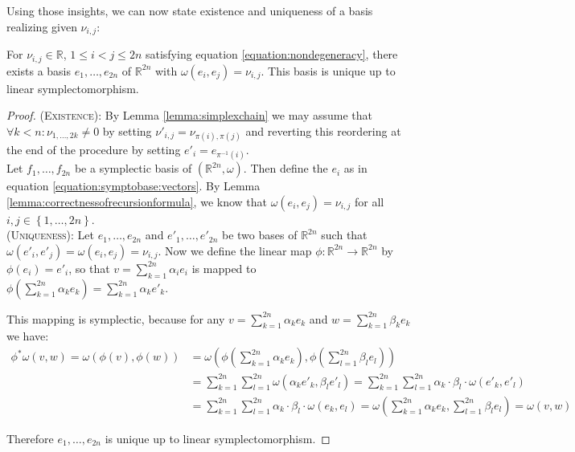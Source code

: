 \documentclass[../SymplecticSimplices.tex]{subfiles}
\begin{document}
Using those insights, we can now state existence and uniqueness of a basis realizing given \( \nu_{i,j} \):

\begin{theorem}
  \label{theorem:uniquebase}
  For \( \nu_{i,j} \in \mathbb{R} \), \( 1 \leq i < j \leq 2n \) satisfying equation \eqref{equation:nondegeneracy}, there exists a basis \( e_1, \dots, e_{2n} \) of \( \mathbb{R}^{2n} \) with \( \omega \left( e_i, e_j \right) = \nu_{i,j} \).
  This basis is unique up to linear symplectomorphism.
\end{theorem}

\begin{proof}
  (\textsc{Existence}): By Lemma \ref{lemma:simplexchain} we may assume that \( \forall k < n : \nu_{1,\dots,2k } \neq 0 \) by setting \( \nu'_{i,j} = \nu_{\pi\left( i \right), \pi \left( j \right)} \) and reverting this reordering at the end of the procedure by setting \( e'_i = e_{\pi^{-1} \left( i \right)} \).\\
  Let \( f_1, \dots, f_{2n} \) be a symplectic basis of \( \left( \mathbb{R}^{2n}, \omega \right) \). Then define the \( e_i \) as in equation \eqref{equation:symptobase:vectors}. By Lemma \ref{lemma:correctnessofrecursionformula}, we know that \( \omega \left( e_i, e_j \right) = \nu_{i,j} \) for all \( i,j \in \left\lbrace 1, \dots, 2n \right\rbrace \).\\

  (\textsc{Uniqueness}): Let \( e_1, \dots , e_{2n} \) and \( e'_1, \dots, e'_{2n} \) be two bases of \( \mathbb{R}^{2n} \) such that \( \omega \left( e'_i, e'_j \right) = \omega \left( e_i, e_j \right) = \nu_{i,j} \). Now we define the linear map \( \phi \colon \mathbb{R}^{2n} \rightarrow \mathbb{R}^{2n} \) by \( \phi \left( e_i \right) = e'_i \), so that \( v = \sum_{k=1}^{2n} \alpha_i e_i \) is mapped to \( \phi \left( \sum_{k=1}^{2n} \alpha_k e_k \right) = \sum_{k=1}^{2n} \alpha_k e'_k \).
  
  This mapping is symplectic, because for any \( v  = \sum_{k=1}^{2n} \alpha_k e_k \) and \( w = \sum_{k=1}^{2n} \beta_k e_k \) we have:
  \begin{align*}
    \phi^{\ast} \omega \left( v, w \right) = \omega \left( \phi \left( v \right), \phi \left( w \right) \right) & = \omega \left( \phi \left( \sum_{k=1}^{2n} \alpha_k e_k \right), \phi \left( \sum_{l=1}^{2n} \beta_l e_l \right) \right) \\ &
        = \sum_{k=1}^{2n} \sum_{l=1}^{2n} \omega \left( \alpha_k e'_k, \beta_l e'_l \right) 
        = \sum_{k=1}^{2n} \sum_{l=1}^{2n} \alpha_k \cdot \beta_l \cdot \omega \left( e'_k, e'_l \right) \\ &
        = \sum_{k=1}^{2n} \sum_{l=1}^{2n} \alpha_k \cdot \beta_l \cdot \omega \left( e_k, e_l \right) 
        = \omega \left( \sum_{k=1}^{2n} \alpha_k e_k, \sum_{l=1}^{2n} \beta_l e_l \right) 
        = \omega \left( v, w \right)
  \end{align*}

  Therefore \( e_1, \dots, e_{2n} \) is unique up to linear symplectomorphism.
\end{proof}
\end{document}
